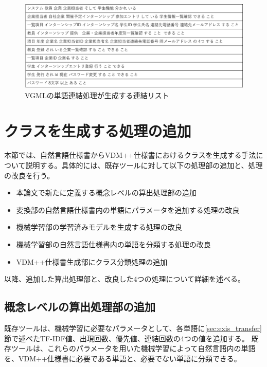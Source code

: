 \begin{figure}[t]
    \begin{center}
        \includegraphics[width=1.0\columnwidth]{image/vgml_connect_list.png}
        \caption{VGMLの単語連結処理が生成する連結リスト}
        \label{fig:vgml_connect_list}
    \end{center}
\end{figure}

\section{クラスを生成する処理の追加}
\label{sec:generate_class}
本節では、自然言語仕様書からVDM++仕様書におけるクラスを生成する手法について説明する。具体的には、既存ツールに対して以下の処理部の追加と、処理の改良を行う。

\begin{itemize}
    \item 本論文で新たに定義する概念レベルの算出処理部の追加
    \item 変換部の自然言語仕様書内の単語にパラメータを追加する処理の改良
    \item 機械学習部の学習済みモデルを生成する処理の改良
    \item 機械学習部の自然言語仕様書内の単語を分類する処理の改良
    \item VDM++仕様書生成部にクラス分類処理の追加
\end{itemize}

以降、追加した算出処理部と、改良した4つの処理について詳細を述べる。

\subsection{概念レベルの算出処理部の追加}
\label{sec:part_calc_concept_level}
既存ツールは、機械学習に必要なパラメータとして、各単語に\ref{sec:exis_transfer}節で述べたTF-IDF値、出現回数、優先値、連結回数の4つの値を追加する。
既存ツールは、これらのパラメータを用いた機械学習によって自然言語内の単語を、VDM++仕様書に必要である単語と、必要でない単語に分類できる。

